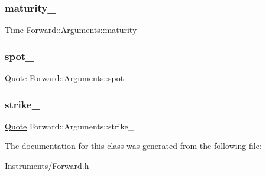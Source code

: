 \subsubsection{\texorpdfstring{maturity\+\_\+}{maturity\_}}
{\footnotesize\ttfamily \hyperlink{_name_def_8h_ac2d3e0ba793497bcca555c7c2cf64ff3}{Time} Forward\+::\+Arguments\+::maturity\+\_\+}

\hypertarget{class_forward_1_1_arguments_a407ca35969703b95866bc0c68d49d631}{}\label{class_forward_1_1_arguments_a407ca35969703b95866bc0c68d49d631} 
\subsubsection{\texorpdfstring{spot\+\_\+}{spot\_}}
{\footnotesize\ttfamily \hyperlink{_name_def_8h_a642a6c5fd87319d922637de0e0bb0305}{Quote} Forward\+::\+Arguments\+::spot\+\_\+}

\hypertarget{class_forward_1_1_arguments_acc295ee300d99631259b82448bc1184c}{}\label{class_forward_1_1_arguments_acc295ee300d99631259b82448bc1184c} 
\subsubsection{\texorpdfstring{strike\+\_\+}{strike\_}}
{\footnotesize\ttfamily \hyperlink{_name_def_8h_a642a6c5fd87319d922637de0e0bb0305}{Quote} Forward\+::\+Arguments\+::strike\+\_\+}



The documentation for this class was generated from the following file\+:\begin{DoxyCompactItemize}
\item 
Instruments/\hyperlink{_forward_8h}{Forward.\+h}\end{DoxyCompactItemize}
